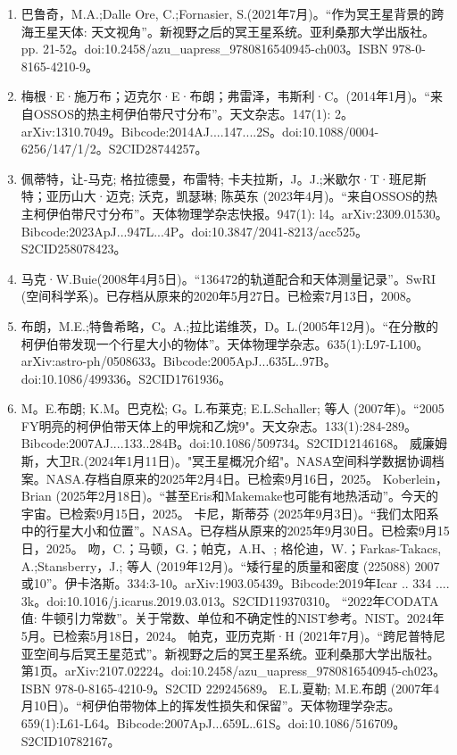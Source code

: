 \begin{enumerate}
\item 巴鲁奇，M.A.;Dalle Ore, C.;Fornasier, S.(2021年7月)。“作为冥王星背景的跨海王星天体: 天文视角”。新视野之后的冥王星系统。亚利桑那大学出版社。pp. 21-52。doi:10.2458/azu_uapress_9780816540945-ch003。ISBN 978-0-8165-4210-9。
\item 梅根·E·施万布；迈克尔·E·布朗；弗雷泽，韦斯利·C。(2014年1月)。“来自OSSOS的热主柯伊伯带尺寸分布”。天文杂志。147(1): 2。arXiv:1310.7049。Bibcode:2014AJ....147....2S。doi:10.1088/0004-6256/147/1/2。S2CID28744257。 
\item 佩蒂特，让-马克; 格拉德曼，布雷特; 卡夫拉斯，J。J.;米歇尔·T·班尼斯特；亚历山大·迈克; 沃克，凯瑟琳; 陈英东 (2023年4月)。“来自OSSOS的热主柯伊伯带尺寸分布”。天体物理学杂志快报。947(1): l4。arXiv:2309.01530。Bibcode:2023ApJ...947L...4P。doi:10.3847/2041-8213/acc525。S2CID258078423。 
\item 马克·W.Buie(2008年4月5日)。“136472的轨道配合和天体测量记录”。SwRI (空间科学系)。已存档从原来的2020年5月27日。已检索7月13日，2008。
\item 布朗，M.E.;特鲁希略，C。A.;拉比诺维茨，D。L.(2005年12月)。“在分散的柯伊伯带发现一个行星大小的物体”。天体物理学杂志。635(1):L97-L100。arXiv:astro-ph/0508633。Bibcode:2005ApJ...635L..97B。doi:10.1086/499336。S2CID1761936。  
\item M。E.布朗; K.M。巴克松; G。L.布莱克; E.L.Schaller; 等人 (2007年)。“2005 FY明亮的柯伊伯带天体上的甲烷和乙烷9"。天文杂志。133(1):284-289。Bibcode:2007AJ....133..284B。doi:10.1086/509734。S2CID12146168。 
 威廉姆斯，大卫R.(2024年1月11日)。"冥王星概况介绍"。NASA空间科学数据协调档案。NASA.存档自原来的2025年2月4日。已检索9月16日，2025。
 Koberlein，Brian (2025年2月18日)。“甚至Eris和Makemake也可能有地热活动”。今天的宇宙。已检索9月15日，2025。
 卡尼，斯蒂芬 (2025年9月3日)。“我们太阳系中的行星大小和位置”。NASA。已存档从原来的2025年9月30日。已检索9月15日，2025。
 吻，C.；马顿，G.；帕克，A.H、; 格伦迪，W.；Farkas-Takacs, A.;Stansberry，J.; 等人 (2019年12月)。“矮行星的质量和密度 (225088) 2007或10”。伊卡洛斯。334:3-10。arXiv:1903.05439。Bibcode:2019年Icar .. 334 .... 3k。doi:10.1016/j.icarus.2019.03.013。S2CID119370310。 
 “2022年CODATA值: 牛顿引力常数”。关于常数、单位和不确定性的NIST参考。NIST。2024年5月。已检索5月18日，2024。
 帕克，亚历克斯·H (2021年7月)。“跨尼普特尼亚空间与后冥王星范式”。新视野之后的冥王星系统。亚利桑那大学出版社。第1页。arXiv:2107.02224。doi:10.2458/azu_uapress_9780816540945-ch023。ISBN 978-0-8165-4210-9。S2CID 229245689。
 E.L.夏勒; M.E.布朗 (2007年4月10日)。“柯伊伯带物体上的挥发性损失和保留”。天体物理学杂志。659(1):L61-L64。Bibcode:2007ApJ...659L..61S。doi:10.1086/516709。S2CID10782167。  

\end{enumerate}
